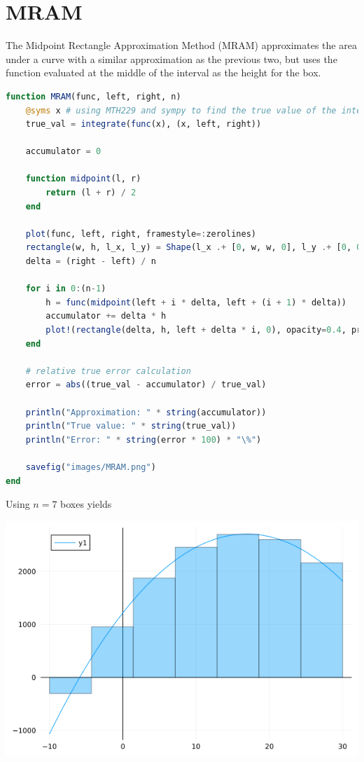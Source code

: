 \documentclass[12pt]{article}
\begin{document}
\section{MRAM}
    The Midpoint Rectangle Approximation Method (MRAM) approximates the area under a curve with a similar approximation as the previous two, but uses the function evaluated 
    at the middle of the interval as the height for the box. 
    \begin{lstlisting}[language=julia]
function MRAM(func, left, right, n)
    @syms x # using MTH229 and sympy to find the true value of the integral
    true_val = integrate(func(x), (x, left, right))

    accumulator = 0

    function midpoint(l, r)
        return (l + r) / 2
    end
    
    plot(func, left, right, framestyle=:zerolines)
    rectangle(w, h, l_x, l_y) = Shape(l_x .+ [0, w, w, 0], l_y .+ [0, 0, h, h])
    delta = (right - left) / n

    for i in 0:(n-1)
        h = func(midpoint(left + i * delta, left + (i + 1) * delta))
        accumulator += delta * h
        plot!(rectangle(delta, h, left + delta * i, 0), opacity=0.4, primary=false)
    end

    # relative true error calculation
    error = abs((true_val - accumulator) / true_val)

    println("Approximation: " * string(accumulator))
    println("True value: " * string(true_val))
    println("Error: " * string(error * 100) * "\%")

    savefig("images/MRAM.png")
end
    \end{lstlisting}
    Using $n=7$ boxes yields
    \begin{center}
        \includegraphics*[scale=0.45]{images/MRAM_1.png}
    \end{center}
\end{document}
